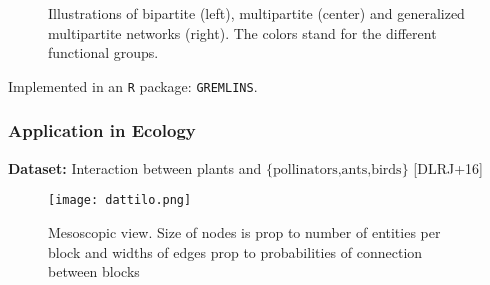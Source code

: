 \documentclass[nopagenumber,9pt]{beamer}
\newcommand{\citemano}[1]{\textcolor{dgreen}{#1}}
\begin{document}
\begin{frame}
\begin{figure}
\begin{minipage}[t]{0.3\linewidth}
    \end{minipage}

\caption{Illustrations of bipartite (left), multipartite (center) and generalized multipartite networks (right). The colors stand for the different functional groups. }
\label{fig:schema bipar}
\end{figure}

 
 Implemented in an \texttt{R} package: \texttt{GREMLINS}.

 
\end{frame}


\begin{frame}
 \frametitle{Application in Ecology}
 \textbf{Dataset:} Interaction between plants and $\{\text{pollinators,ants,birds}\}$  \citemano{[DLRJ+16]}
 
\begin{figure}[ht]
\centering
   \texttt{[image: dattilo.png]}
   \caption{Mesoscopic view. Size of nodes is prop to number of entities per block and widths of edges prop to probabilities of connection between blocks}%
   \label{fig:estim dattilo}
\end{figure}
\end{frame}
\end{document}
